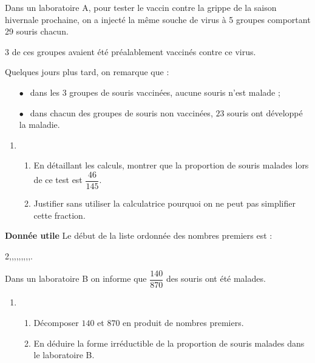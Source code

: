 
\medskip

Dans un laboratoire A, pour tester le vaccin contre la grippe de la saison hivernale prochaine, on a injecté la même souche de virus à 5 groupes comportant 29 souris chacun.

3 de ces groupes avaient été préalablement vaccinés contre ce virus.

Quelques jours plus tard, on remarque que :

\setlength\parindent{10mm}
\begin{itemize}
\item[$\bullet~~$] dans les $3$ groupes de souris vaccinées, aucune souris n'est malade ;
\item[$\bullet~~$] dans chacun des groupes de souris non vaccinées, $23$ souris ont développé la maladie.
\end{itemize}
\setlength\parindent{0mm} 

\medskip
 
\begin{enumerate}
\item 
	\begin{enumerate}
		\item En détaillant les calculs, montrer que la proportion de souris malades lors de ce test est $\dfrac{46}{145}$.
		\item Justifier sans utiliser la calculatrice pourquoi on ne peut pas simplifier cette fraction.
	\end{enumerate}	
\end{enumerate}
		
\textbf{Donnée utile} Le début de la liste ordonnée des nombres premiers est : 
		
		2,,,,,,,,,.
		
Dans un laboratoire B on informe que $\dfrac{140}{870}$ des souris ont été malades.

\begin{enumerate}[resume]		
\item  
	\begin{enumerate}
		\item Décomposer $140$ et $870$ en produit de nombres premiers.
		\item En déduire la forme irréductible de la proportion de souris malades dans le laboratoire B.
	\end{enumerate}
\end{enumerate}

\vspace{0,5cm}

